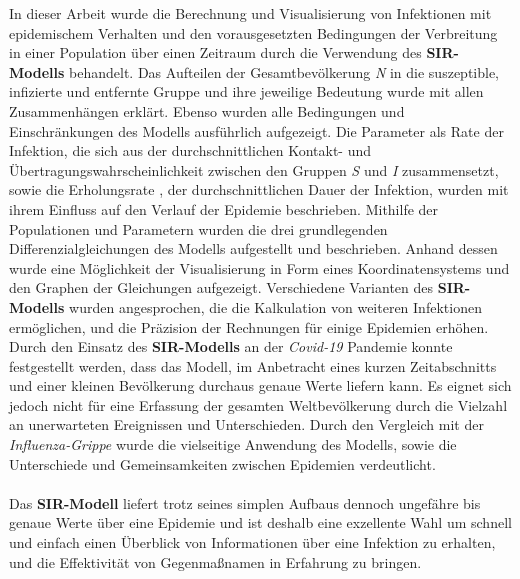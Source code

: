\documentclass[12pt]{scrartcl} %
\begin{document}
In dieser Arbeit wurde die Berechnung und Visualisierung von Infektionen mit epidemischem Verhalten und den vorausgesetzten Bedingungen der Verbreitung in einer Population über einen Zeitraum durch die Verwendung des \textbf{SIR-Modells} behandelt. Das Aufteilen der Gesamtbevölkerung \textit{N} in die suszeptible, infizierte und entfernte Gruppe und ihre jeweilige Bedeutung wurde mit allen Zusammenhängen erklärt. Ebenso wurden alle Bedingungen und Einschränkungen des Modells ausführlich aufgezeigt.
Die Parameter \textbeta\space als Rate der Infektion, die sich aus der durchschnittlichen Kontakt- und Übertragungswahrscheinlichkeit zwischen den Gruppen \textit{S} und \textit{I} zusammensetzt, sowie die Erholungsrate \textgamma\space, der durchschnittlichen Dauer der Infektion, wurden mit ihrem Einfluss auf den Verlauf der Epidemie beschrieben. Mithilfe der Populationen und Parametern wurden die drei grundlegenden Differenzialgleichungen des Modells aufgestellt und beschrieben. Anhand dessen wurde eine Möglichkeit der Visualisierung in Form eines Koordinatensystems und den Graphen der Gleichungen aufgezeigt.
Verschiedene Varianten des \textbf{SIR-Modells} wurden angesprochen, die die Kalkulation von weiteren Infektionen ermöglichen, und die Präzision der Rechnungen für einige Epidemien erhöhen. Durch den Einsatz des \textbf{SIR-Modells} an der \textsl{Covid-19} Pandemie konnte festgestellt werden, dass das Modell, im Anbetracht eines kurzen Zeitabschnitts und einer kleinen Bevölkerung durchaus genaue Werte liefern kann. Es eignet sich jedoch nicht für eine Erfassung der gesamten Weltbevölkerung durch die Vielzahl an unerwarteten Ereignissen und Unterschieden. Durch den Vergleich mit der \textsl{Influenza-Grippe} wurde die vielseitige Anwendung des Modells, sowie die Unterschiede und Gemeinsamkeiten zwischen Epidemien verdeutlicht.\\
\\
Das \textbf{SIR-Modell} liefert trotz seines simplen Aufbaus dennoch ungefähre bis genaue Werte über eine Epidemie und ist deshalb eine exzellente Wahl um schnell und einfach einen Überblick von Informationen über eine Infektion zu erhalten, und die Effektivität von Gegenmaßnamen in Erfahrung zu bringen.


\newpage
\setlength{\bibitemsep}{\baselineskip}
\printbibliography[heading=bibintoc]
\thispagestyle{empty}
\newpage
\cleardoublepage
\listoffigures
\thispagestyle{empty}
\end{document}
